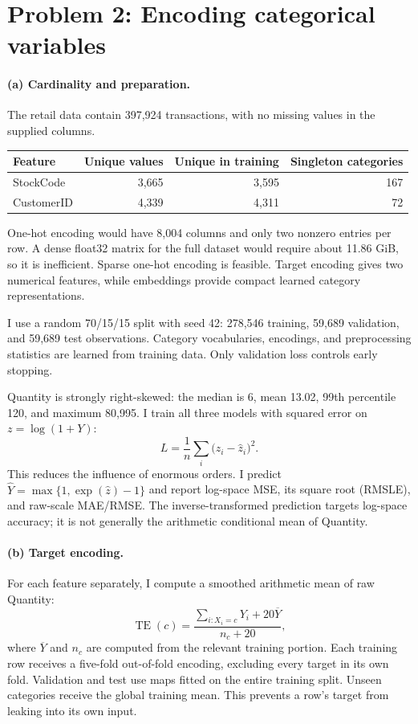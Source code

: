 \section*{Problem 2: Encoding categorical variables}

\paragraph{(a) Cardinality and preparation.} The retail data contain 397,924 transactions, with no missing values in the supplied columns.
\begin{center}
\begin{tabular}{lrrr}
\toprule
Feature & Unique values & Unique in training & Singleton categories\\
\midrule
StockCode & 3,665 & 3,595 & 167\\
CustomerID & 4,339 & 4,311 & 72\\
\bottomrule
\end{tabular}
\end{center}
One-hot encoding would have 8,004 columns and only two nonzero entries per row. A dense float32 matrix for the full dataset would require about 11.86 GiB, so it is inefficient. Sparse one-hot encoding is feasible. Target encoding gives two numerical features, while embeddings provide compact learned category representations.

I use a random 70/15/15 split with seed 42: 278,546 training, 59,689 validation, and 59,689 test observations. Category vocabularies, encodings, and preprocessing statistics are learned from training data. Only validation loss controls early stopping.

Quantity is strongly right-skewed: the median is 6, mean 13.02, 99th percentile 120, and maximum 80,995. I train all three models with squared error on $z=\log(1+Y)$:
\[
L=\frac1n\sum_i\big(z_i-\widehat z_i\big)^2.
\]
This reduces the influence of enormous orders. I predict $\widehat Y=\max\{1,\exp(\widehat z)-1\}$ and report log-space MSE, its square root (RMSLE), and raw-scale MAE/RMSE. The inverse-transformed prediction targets log-space accuracy; it is not generally the arithmetic conditional mean of Quantity.

\paragraph{(b) Target encoding.} For each feature separately, I compute a smoothed arithmetic mean of raw Quantity:
\[
\operatorname{TE}(c)=\frac{\sum_{i:X_i=c}Y_i+20\overline Y}{n_c+20},
\]
where $\overline Y$ and $n_c$ are computed from the relevant training portion. Each training row receives a five-fold out-of-fold encoding, excluding every target in its own fold. Validation and test use maps fitted on the entire training split. Unseen categories receive the global training mean. This prevents a row's target from leaking into its own input.

